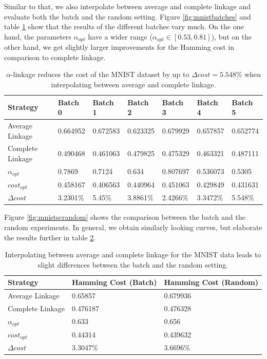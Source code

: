 Similar to that, we also interpolate between average and complete linkage and evaluate both the batch and the random setting. Figure \ref{fig:mnistbatches} and table \ref{table:mnist1000acbatch} show that the results of the different batches vary much. On the one hand, the parameters $\alpha_{opt}$ have a wider range ($\alpha_{opt} \in [0.53,0.81]$), but on the other hand, we get slightly larger improvements for the Hamming cost in comparison to complete linkage.

\begin{table}[h]
    \centering
    \begin{tabular}{|l | l l l l l l |}
    \hline
    Strategy & Batch 0 & Batch 1 & Batch 2 & Batch 3 & Batch 4 & Batch 5\\ \hline
    Average Linkage & 0.664952 & 0.672583 & 0.623325 & 0.679929 & 0.657857 & 0.652774\\
    Complete Linkage & 0.490468 & 0.461063 & 0.479825 & 0.475329 & 0.463321 & 0.487111\\
    $\alpha_{opt}$ & 0.7869 & 0.7124 & 0.634 & 0.807697 & 0.536073 & 0.5305\\
    $cost_{opt}$ & 0.458167 & 0.406563 & 0.440964 & 0.451063 & 0.429849 & 0.431631\\
    $\Delta cost$ & 3.2301\% & 5.45\% & 3.8861\% & 2.4266\% & 3.3472\% & 5.548\%\\\hline
    \end{tabular}
    \caption{$\alpha$-linkage reduces the cost of the MNIST dataset by up to $\Delta cost = 5.548\%$ when interpolating between average and complete linkage.}
    \label{table:mnist1000acbatch}
\end{table}

Figure \ref{fig:mnistscrandom} shows the comparison between the batch and the random experiments. In general, we obtain similarly looking curves, but elaborate the results further in table \ref{table:mnistacavg}.

\begin{table}[H]
    \centering
    \begin{tabular}{|l | l | l |}
    \hline
    Strategy & Hamming Cost (Batch) & Hamming Cost (Random)\\ \hline
    Average Linkage & 0.65857 & 0.679936\\
    Complete Linkage & 0.476187 & 0.476328\\
    $\alpha_{opt}$ & 0.633 & 0.656\\
    $cost_{opt}$ & 0.44314 & 0.439632\\
    $\Delta cost$ & 3.3047\% & 3.6696\%\\\hline
    \end{tabular}
    \caption{Interpolating between average and complete linkage for the MNIST data leads to slight differences between the batch and the random setting.}
    \label{table:mnistacavg}
\end{table}

